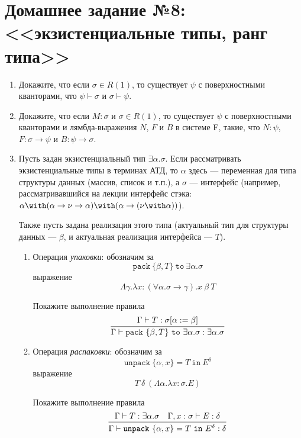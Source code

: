 \documentclass[10pt,a4paper,oneside]{article}
\begin{document}
\section*{Домашнее задание №8: <<экзистенциальные типы, ранг типа>>}

\begin{CJK}{UTF8}{min}
\begin{enumerate}

\item Докажите, что если $\sigma \in R(1)$, то существует $\psi$ с поверхностными кванторами, что
$\psi \vdash \sigma$ и $\sigma \vdash \psi$.

\item Докажите, что если $M:\sigma$ и $\sigma \in R(1)$, то существует $\psi$ с поверхностными
кванторами и лямбда-выражения $N$, $F$ и $B$ в системе F, такие, что $N:\psi$, 
$F:\sigma\rightarrow\psi$ и $B:\psi\rightarrow\sigma$.

\item Пусть задан экзистенциальный тип $\exists\alpha.\sigma$. Если рассматривать экзистенциальные
типы в терминах АТД, то $\alpha$ здесь --- переменная для типа структуры данных (массив, список и т.п.),
а $\sigma$ --- интерфейс (например, рассматривавшийся на лекции интерфейс стэка: 
$\alpha \with (\alpha\rightarrow\nu\rightarrow\alpha) \with (\alpha\rightarrow(\nu\with\alpha))$).

Также пусть задана реализация этого типа (актуальный тип для структуры данных --- $\beta$, и
актуальная реализация интерфейса --- $T$).

\begin{enumerate}
\item 
Операция \emph{упаковки}: обозначим за $$\texttt{pack}\ \{\beta,T\}\ \texttt{to}\ \exists\alpha.\sigma$$ выражение 
$$\Lambda \gamma.\lambda x: (\forall \alpha. \sigma\rightarrow\gamma).x\ \beta\ T$$

Покажите выполнение правила
$$\infer{\Gamma\vdash\texttt{pack}\ \{\beta,T\}\ \texttt{to}\ \exists\alpha.\sigma : \exists\alpha.\sigma}
{\Gamma\vdash T : \sigma[\alpha := \beta]}$$

\item Операция \emph{распаковки}: обозначим за $$\texttt{unpack}\ \{\alpha,x\} = T\ \texttt{in}\ E^\delta$$ выражение
$$T\ \delta\ (\Lambda \alpha.\lambda x: \sigma.E)$$

Покажите выполнение правила
$$\infer{\Gamma\vdash \texttt{unpack}\ \{\alpha,x\} = T\ \texttt{in}\ E^\delta: \delta}
{\Gamma\vdash T : \exists\alpha.\sigma \quad \Gamma,x:\sigma \vdash E : \delta}$$


\end{enumerate}
\end{enumerate}
\end{CJK}
\end{document}

